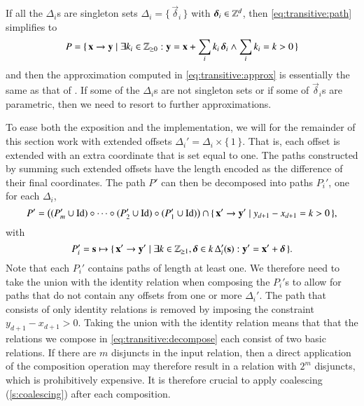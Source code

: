 If all the $\Delta_i$s are singleton sets
$\Delta_i = \{\, \vec \delta_i \,\}$ with $\vec \delta_i \in \Z^d$,
then \eqref{eq:transitive:path} simplifies to
\begin{equation}
\label{eq:transitive:singleton}
P = \{\, \vec x \to \vec y \mid
\exists k_i \in \Z_{\ge 0} :
\vec y = \vec x + \sum_i k_i \, \vec \delta_i
\wedge
\sum_i k_i = k > 0
\,\}
\end{equation}
and then the approximation computed in \eqref{eq:transitive:approx}
is essentially the same as that of \textcite{Beletska2009}.
If some of the $\Delta_i$s are not singleton sets or if
some of $\vec \delta_i$s are parametric, then we need
to resort to further approximations.

To ease both the exposition and the implementation, we will for
the remainder of this section work with extended offsets
$\Delta_i' = \Delta_i \times \{\, 1 \,\}$.
That is, each offset is extended with an extra coordinate that is
set equal to one.  The paths constructed by summing such extended
offsets have the length encoded as the difference of their
final coordinates.  The path $P'$ can then be decomposed into
paths $P_i'$, one for each $\Delta_i$,
\begin{equation}
\label{eq:transitive:decompose}
P' = \left(
(P_m' \cup \identity) \circ \cdots \circ
(P_2' \cup \identity) \circ
(P_1' \cup \identity)
\right) \cap
\{\,
\vec x' \to \vec y' \mid y_{d+1} - x_{d+1} = k > 0
\,\}
,
\end{equation}
with
$$
P_i' = \vec s \mapsto \{\, \vec x' \to \vec y' \mid
\exists k \in \Z_{\ge 1}, \vec \delta \in k \, \Delta_i'(\vec s) :
\vec y' = \vec x' + \vec \delta
\,\}
.
$$
Note that each $P_i'$ contains paths of length at least one.
We therefore need to take the union with the identity relation
when composing the $P_i'$s to allow for paths that do not contain
any offsets from one or more $\Delta_i'$.
The path that consists of only identity relations is removed
by imposing the constraint $y_{d+1} - x_{d+1} > 0$.
Taking the union with the identity relation means that
that the relations we compose in \eqref{eq:transitive:decompose}
each consist of two basic relations.  If there are $m$
disjuncts in the input relation, then a direct application
of the composition operation may therefore result in a relation
with $2^m$ disjuncts, which is prohibitively expensive.
It is therefore crucial to apply coalescing (\autoref{s:coalescing})
after each composition.

